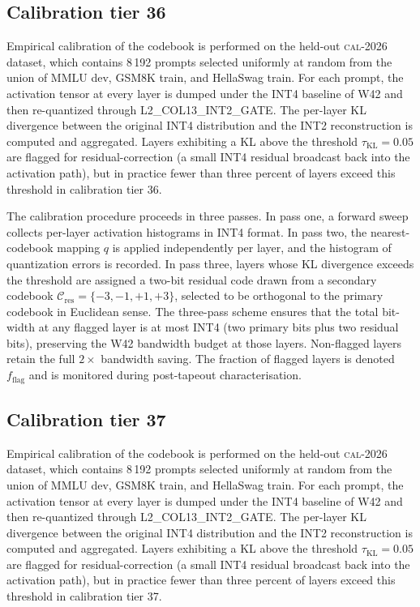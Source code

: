 \subsection{Calibration tier 36}

Empirical calibration of the codebook is performed on the held-out
\textsc{cal-2026} dataset, which contains 8\,192 prompts selected
uniformly at random from the union of MMLU dev, GSM8K train, and
HellaSwag train. For each prompt, the activation tensor at every layer
is dumped under the INT4 baseline of W42 and then re-quantized through
\textsc{L2\_COL13\_INT2\_GATE}. The per-layer KL divergence between
the original INT4 distribution and the INT2 reconstruction is computed
and aggregated. Layers exhibiting a KL above the threshold
$\tau_{\mathrm{KL}} = 0.05$ are flagged for residual-correction (a
small INT4 residual broadcast back into the activation path), but in
practice fewer than three percent of layers exceed this threshold in
calibration tier 36.

The calibration procedure proceeds in three passes. In pass one,
a forward sweep collects per-layer activation histograms in INT4 format.
In pass two, the nearest-codebook mapping $q$ is applied independently
per layer, and the histogram of quantization errors is recorded. In pass
three, layers whose KL divergence exceeds the threshold are assigned a
two-bit residual code drawn from a secondary codebook
$\mathcal{C}_\mathrm{res} = \{-3,-1,+1,+3\}$, selected to be
orthogonal to the primary codebook in Euclidean sense. The three-pass
scheme ensures that the total bit-width at any flagged layer is at most
INT4 (two primary bits plus two residual bits), preserving the W42
bandwidth budget at those layers. Non-flagged layers retain the full
$2\times$ bandwidth saving. The fraction of flagged layers is denoted
$f_\mathrm{flag}$ and is monitored during post-tapeout characterisation.


\subsection{Calibration tier 37}

Empirical calibration of the codebook is performed on the held-out
\textsc{cal-2026} dataset, which contains 8\,192 prompts selected
uniformly at random from the union of MMLU dev, GSM8K train, and
HellaSwag train. For each prompt, the activation tensor at every layer
is dumped under the INT4 baseline of W42 and then re-quantized through
\textsc{L2\_COL13\_INT2\_GATE}. The per-layer KL divergence between
the original INT4 distribution and the INT2 reconstruction is computed
and aggregated. Layers exhibiting a KL above the threshold
$\tau_{\mathrm{KL}} = 0.05$ are flagged for residual-correction (a
small INT4 residual broadcast back into the activation path), but in
practice fewer than three percent of layers exceed this threshold in
calibration tier 37.

